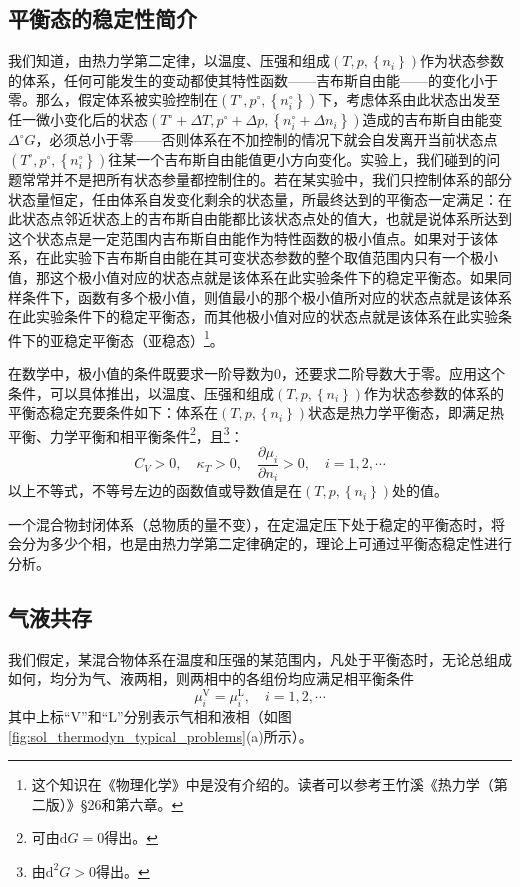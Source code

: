 \documentclass[main.tex]{subfiles}
\begin{document}
\subsection{平衡态的稳定性简介}
我们知道，由热力学第二定律，以温度、压强和组成$\left(T,p,\left\{n_i\right\}\right)$作为状态参数的体系，任何可能发生的变动都使其特性函数——吉布斯自由能——的变化小于零。那么，假定体系被实验控制在$\left(T^\circ,p^\circ,\left\{n_i^\circ\right\}\right)$下，考虑体系由此状态出发至任一微小变化后的状态$\left(T^\circ+\Delta T,p^\circ+\Delta p,\left\{n_i^\circ+\Delta n_i\right\}\right)$造成的吉布斯自由能变$\Delta^\circ G$，必须总小于零——否则体系在不加控制的情况下就会自发离开当前状态点$\left(T^\circ,p^\circ,\left\{n_i^\circ\right\}\right)$往某一个吉布斯自由能值更小方向变化。实验上，我们碰到的问题常常并不是把所有状态参量都控制住的。若在某实验中，我们只控制体系的部分状态量恒定，任由体系自发变化剩余的状态量，所最终达到的平衡态一定满足：在此状态点邻近状态上的吉布斯自由能都比该状态点处的值大，也就是说体系所达到这个状态点是一定范围内吉布斯自由能作为特性函数的极小值点。如果对于该体系，在此实验下吉布斯自由能在其可变状态参数的整个取值范围内只有一个极小值，那这个极小值对应的状态点就是该体系在此实验条件下的稳定平衡态。如果同样条件下，函数有多个极小值，则值最小的那个极小值所对应的状态点就是该体系在此实验条件下的稳定平衡态，而其他极小值对应的状态点就是该体系在此实验条件下的亚稳定平衡态（亚稳态）\footnote{这个知识在《物理化学》中是没有介绍的。读者可以参考王竹溪《热力学（第二版）》\S26和第六章。}。

在数学中，极小值的条件既要求一阶导数为0，还要求二阶导数大于零。应用这个条件，可以具体推出，以温度、压强和组成$\left(T,p,\left\{n_i\right\}\right)$作为状态参数的体系的平衡态稳定充要条件如下：体系在$\left(T,p,\left\{n_i\right\}\right)$状态是热力学平衡态，即满足热平衡、力学平衡和相平衡条件\footnote{可由$\mathrm{d}G=0$得出。}，且\footnote{由$\mathrm{d}^2G>0$得出。}：
\[C_V>0,\quad \kappa_T>0,\quad \frac{\partial \mu_i}{\partial n_i}>0,\quad i=1,2,\cdots\]
以上不等式，不等号左边的函数值或导数值是在$\left(T,p,\left\{n_i\right\}\right)$处的值。

一个混合物封闭体系（总物质的量不变），在定温定压下处于稳定的平衡态时，将会分为多少个相，也是由热力学第二定律确定的，理论上可通过平衡态稳定性进行分析。

\subsection{气液共存}
我们假定，某混合物体系在温度和压强的某范围内，凡处于平衡态时，无论总组成如何，均分为气、液两相，则两相中的各组份均应满足相平衡条件
\[\mu_i^\text{V}=\mu_i^\text{L},\quad i=1,2,\cdots\]
其中上标“V”和“L”分别表示气相和液相（如图\ref{fig:sol_thermodyn_typical_problems}(a)所示）。
\end{document}
